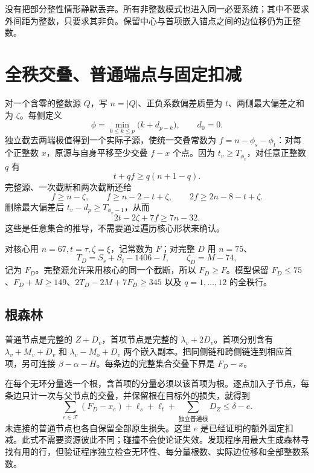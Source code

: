 \documentclass[11pt,a4paper]{article}
\begin{document}
没有把部分整性情形静默丢弃。所有非整数模式也进入同一必要系统；其中不要求外间距为整数，只要求其非负。保留中心与首项嵌入锚点之间的边位移仍为正整数。

\hypertarget{ux5168ux79e9ux4ea4ux53e0ux666eux901aux7aefux70b9ux4e0eux56faux5b9aux6263ux51cf}{%
\section{全秩交叠、普通端点与固定扣减}\label{ux5168ux79e9ux4ea4ux53e0ux666eux901aux7aefux70b9ux4e0eux56faux5b9aux6263ux51cf}}

对一个含零的整数源 \(Q\)，写 \(n=|Q|\)、正负系数偏差质量为
\(t\)、两侧最大偏差之和为 \(\zeta\)。每侧定义 \[
 \phi=\min_{0\le k\le p}\bigl(k+d_{p-k}\bigr),\qquad d_0=0.
\] 独立截去两端极值得到一个实际子源，使统一交叠常数为
\(f=n-\phi_s-\phi_t\)：对每个正整数 \(x\)，原源与自身平移至少交叠
\(f-x\) 个点。因为 \(t_v\ge T_{\phi_v}\)，对任意正整数 \(q\) 有 \[
 t+qf\ge q(n+1-q).
\] 完整源、一次截断和两次截断还给 \[
 f\ge n-\zeta,\qquad f\ge n-2-t+\zeta,\qquad
 2f\ge2n-8-t+\zeta.
\] 删除最大偏差后 \(t_v-d_p\ge T_{\phi_v-1}\)，从而 \[
 2t-2\zeta+7f\ge7n-32.
\] 这些是任意集合的推导，不需要通过遍历核心形状来确认。

对核心用 \(n=67,t=\tau,\zeta=\xi\)，记常数为 \(F\)；对完整 \(D\) 用
\(n=75\)、 \[
 T_D=S_s+S_t-1406-I,\qquad\zeta_D=M-74,
\] 记为 \(F_D\)。完整源允许采用核心的同一个截断，所以
\(F_D\ge F\)。模型保留
\(F_D\le75\)、\(F_D+M\ge149\)、\(2T_D-2M+7F_D\ge345\) 以及
\(q=1,\ldots,12\) 的全秩行。

\hypertarget{ux6839ux68eeux6797}{%
\subsection{根森林}\label{ux6839ux68eeux6797}}

普通节点是完整的 \(Z+D_v\)，首项节点是完整的
\(\lambda_v+2D_v\)。首项分别含有 \(\lambda_v+M_v+D_v\) 和
\(\lambda_v-M_o+D_v\)
两个嵌入副本。把同侧链和跨侧链连到相应首项，另可连接
\(\beta-\alpha-H\)。每条边的完整集合交叠下界是 \(F_D-x\)。

在每个无环分量选一个根，含首项的分量必须以该首项为根。逐点加入子节点，每条边只计一次与父节点的交叠，并保留根在目标外的损失，就得到
\[
 \sum_{e\in\mathcal F}(F_D-x_e)+\ell_s+\ell_t+
 \sum_{\text{独立普通根}}D_Z\le\delta-e.
\] 未连接的普通节点也各自保留全部原生损失。这里 \(e\)
是已经证明的额外固定扣减。此式不需要资源彼此不同；碰撞不会使论证失效。发现程序用最大生成森林寻找有用的行，但验证程序独立检查无环性、每分量根数、实际边位移和全部整数系数。
\end{document}
